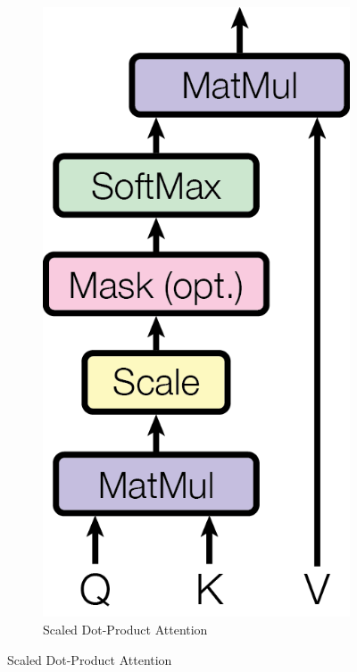 \begin{figure}
    \centering
    \begin{subfigure}[b]{0.35\textwidth}
        \centering
        \includegraphics[width=\textwidth]{assets/charts_rw/Transformer_Attention.png}
        \caption{Scaled Dot-Product Attention}

\end{subfigure}
\end{figure}
